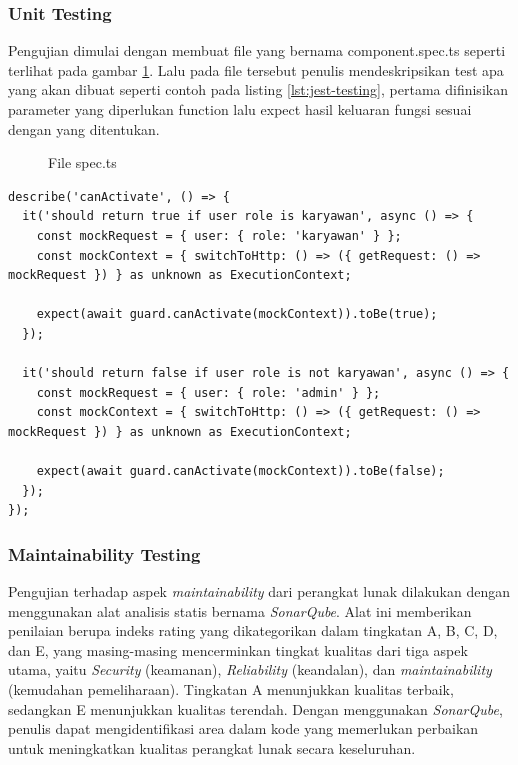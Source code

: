 \subsubsection{Unit Testing}
Pengujian dimulai dengan membuat file yang bernama component.spec.ts seperti terlihat pada gambar \ref{ut1}. Lalu pada file tersebut penulis mendeskripsikan test apa yang akan dibuat seperti contoh pada listing \ref{lst:jest-testing}, pertama difinisikan parameter yang diperlukan function lalu expect hasil keluaran fungsi sesuai dengan yang ditentukan.
\begin{figure}[h]
	{\par}
	\caption{File spec.ts}
	\label{ut1}
\end{figure}

\begin{lstlisting}[caption={Contoh Testing Menggunakan Jest},label={lst:jest-testing}]
  describe('canActivate', () => {
  it('should return true if user role is karyawan', async () => {
    const mockRequest = { user: { role: 'karyawan' } };
    const mockContext = { switchToHttp: () => ({ getRequest: () => mockRequest }) } as unknown as ExecutionContext;

    expect(await guard.canActivate(mockContext)).toBe(true);
  });

  it('should return false if user role is not karyawan', async () => {
    const mockRequest = { user: { role: 'admin' } };
    const mockContext = { switchToHttp: () => ({ getRequest: () => mockRequest }) } as unknown as ExecutionContext;

    expect(await guard.canActivate(mockContext)).toBe(false);
  });
});
\end{lstlisting}
\subsubsection{Maintainability Testing}
Pengujian terhadap aspek \textit{maintainability} dari perangkat lunak dilakukan dengan menggunakan alat analisis statis bernama \textit{SonarQube}. Alat ini memberikan penilaian berupa indeks rating yang dikategorikan dalam tingkatan A, B, C, D, dan E, yang masing-masing mencerminkan tingkat kualitas dari tiga aspek utama, yaitu \textit{Security} (keamanan), \textit{Reliability} (keandalan), dan \textit{maintainability} (kemudahan pemeliharaan). Tingkatan A menunjukkan kualitas terbaik, sedangkan E menunjukkan kualitas terendah. Dengan menggunakan \textit{SonarQube}, penulis dapat mengidentifikasi area dalam kode yang memerlukan perbaikan untuk meningkatkan kualitas perangkat lunak secara keseluruhan.


